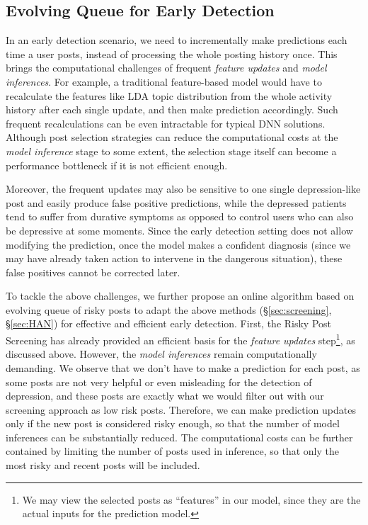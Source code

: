 \subsection{Evolving Queue for Early Detection}
\label{sec:evolving}

In an early detection scenario, we need to incrementally make predictions each time a user posts, instead of processing the whole posting history once.
This brings the computational challenges of frequent \textit{feature updates} and \textit{model inferences}. For example, a traditional feature-based model would have to recalculate the features like LDA topic distribution \citep{blei2003latent} from the whole activity history after each single update, and then make prediction accordingly. Such frequent recalculations can be even intractable for typical DNN solutions. Although post selection strategies can reduce the computational costs at the \textit{model inference} stage to some extent, the selection stage itself can become a performance bottleneck if it is not efficient enough. 

Moreover, the frequent updates may also be sensitive to one single depression-like post and easily produce false positive predictions, while the depressed patients tend to suffer from durative symptoms  \citep{kroenke2001phq} as opposed to control users who can also be depressive at some moments. Since the early detection setting does not allow modifying the prediction, once the model makes a confident diagnosis (since we may have already taken action to intervene in the dangerous situation), these false positives cannot be corrected later.

To tackle the above challenges, we further propose an online algorithm based on evolving queue of risky posts to adapt the above methods (\S \ref{sec:screening}, \S \ref{sec:HAN}) for effective and efficient early detection. First, the Risky Post Screening has already provided an efficient basis for the \textit{feature updates} step\footnote{We may view the selected posts as ``features'' in our model, since they are the actual inputs for the prediction model.}, as discussed above. However, the \textit{model inferences} remain computationally demanding. We observe that we don't have to make a prediction for each post, as some posts are not very helpful or even misleading for the detection of depression, and these posts are exactly what we would filter out with our screening approach as low risk posts. 
Therefore, we can make prediction updates only if the new post is considered 
risky enough, so that the number of model inferences can be substantially reduced. The computational costs can be further contained by limiting the number of posts used in inference, so that only the most risky and recent posts will be included.

